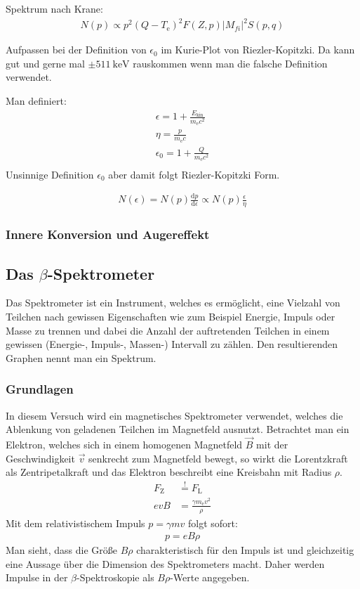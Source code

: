 \documentclass[11pt, a4paper]{article}
\numberwithin{equation}{section}
\begin{document}
Spektrum nach Krane:
\begin{align}
	N(p) \propto p^2 \left( Q - T_\mathrm{e} \right)^2 F(Z, p) \left| M_{fi} \right|^2 S(p, q)
\end{align}

Aufpassen bei der Definition von $\epsilon_0$ im Kurie-Plot von Riezler-Kopitzki.
Da kann gut und gerne mal $\pm \SI{511}{\kilo\electronvolt}$ rauskommen wenn man die falsche Definition verwendet.

Man definiert:
\begin{align}
	\epsilon = 1 + \frac{E_\mathrm{kin}}{m_\mathrm{e} c^2} \\
	\eta = \frac{p}{m_\mathrm{e} c} \\
	\epsilon_0 = 1 + \frac{Q}{m_\mathrm{e} c^2} \\
\end{align}
Unsinnige Definition $\epsilon_0$ aber damit folgt Riezler-Kopitzki Form.

\begin{align}
	N(\epsilon) = N(p) \frac{\mathrm{d}p}{\mathrm{d}\epsilon}\propto N(p) \frac{\epsilon}{\eta}
\end{align}

\subsubsection{Innere Konversion und Augereffekt}

\subsection{Das $\beta$-Spektrometer}
Das Spektrometer ist ein Instrument, welches es ermöglicht, eine Vielzahl von Teilchen nach gewissen Eigenschaften wie zum Beispiel Energie, Impuls oder Masse zu trennen und dabei die Anzahl der auftretenden Teilchen in einem gewissen (Energie-, Impuls-, Massen-) Intervall zu zählen.
Den resultierenden Graphen nennt man ein Spektrum.

\subsubsection{Grundlagen}
In diesem Versuch wird ein magnetisches Spektrometer verwendet, welches die Ablenkung von geladenen Teilchen im Magnetfeld ausnutzt.
Betrachtet man ein Elektron, welches sich in einem homogenen Magnetfeld $\vec{B}$ mit der Geschwindigkeit $\vec{v}$ senkrecht zum Magnetfeld bewegt, so wirkt die Lorentzkraft als Zentripetalkraft und das Elektron beschreibt eine Kreisbahn mit Radius $\rho$.
\begin{align}
	F_\mathrm{Z} &\stackrel{!}{=} F_\mathrm{L} \nonumber\\
	e v B &= \frac{\gamma m_\mathrm{e} v^2}{\rho}
\end{align}
Mit dem relativistischem Impuls $p = \gamma m v$ folgt sofort:
\begin{align}
	p = e B \rho
	\label{eq:impuls_radius}
\end{align}
Man sieht, dass die Größe $B \rho$ charakteristisch für den Impuls ist und gleichzeitig eine Aussage über die Dimension des Spektrometers macht.
Daher werden Impulse in der $\beta$-Spektroskopie als $B \rho$-Werte angegeben.
\end{document}

